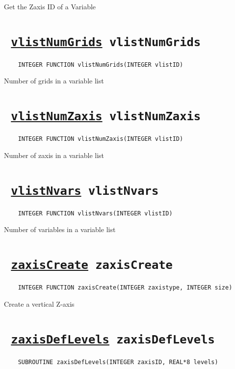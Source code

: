 Get the Zaxis ID of a Variable
\ifpdfoutput{}{(\ref{vlistInqVarZaxis})}


\section*{\texttt{ 
\ifpdf
\hyperref[vlistNumGrids]{vlistNumGrids}
\else
vlistNumGrids
\fi
}}
\begin{verbatim}
    INTEGER FUNCTION vlistNumGrids(INTEGER vlistID)
\end{verbatim}

Number of grids in a variable list
\ifpdfoutput{}{(\ref{vlistNumGrids})}


\section*{\texttt{ 
\ifpdf
\hyperref[vlistNumZaxis]{vlistNumZaxis}
\else
vlistNumZaxis
\fi
}}
\begin{verbatim}
    INTEGER FUNCTION vlistNumZaxis(INTEGER vlistID)
\end{verbatim}

Number of zaxis in a variable list
\ifpdfoutput{}{(\ref{vlistNumZaxis})}


\section*{\texttt{ 
\ifpdf
\hyperref[vlistNvars]{vlistNvars}
\else
vlistNvars
\fi
}}
\begin{verbatim}
    INTEGER FUNCTION vlistNvars(INTEGER vlistID)
\end{verbatim}

Number of variables in a variable list
\ifpdfoutput{}{(\ref{vlistNvars})}


\section*{\texttt{ 
\ifpdf
\hyperref[zaxisCreate]{zaxisCreate}
\else
zaxisCreate
\fi
}}
\begin{verbatim}
    INTEGER FUNCTION zaxisCreate(INTEGER zaxistype, INTEGER size)
\end{verbatim}

Create a vertical Z-axis
\ifpdfoutput{}{(\ref{zaxisCreate})}


\section*{\texttt{ 
\ifpdf
\hyperref[zaxisDefLevels]{zaxisDefLevels}
\else
zaxisDefLevels
\fi
}}
\begin{verbatim}
    SUBROUTINE zaxisDefLevels(INTEGER zaxisID, REAL*8 levels)
\end{verbatim}

